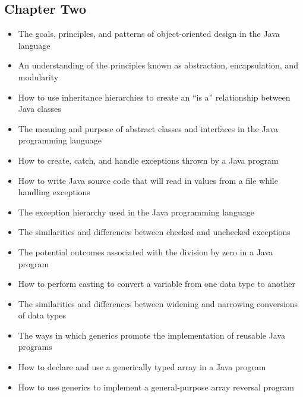 \documentclass[11pt]{article}
\begin{document}
\vspace*{-.2in}
\subsection*{Chapter Two}

\begin{itemize}

  \item The goals, principles, and patterns of object-oriented design in the
    Java language

  \item An understanding of the principles known as abstraction, encapsulation,
    and modularity

  \item How to use inheritance hierarchies to create an ``is a'' relationship
    between Java classes

  \item The meaning and purpose of abstract classes and interfaces in the Java
    programming language

  \item How to create, catch, and handle exceptions thrown by a Java program

  \item How to write Java source code that will read in values from a file while
    handling exceptions

  \item The exception hierarchy used in the Java programming language

  \item The similarities and differences between checked and unchecked
    exceptions

  \item The potential outcomes associated with the division by zero in a Java
    program

  \item How to perform casting to convert a variable from one data type to
    another

  \item The similarities and differences between widening and narrowing
    conversions of data types

  \item The ways in which generics promote the implementation of reusable Java
    programs

  \item How to declare and use a generically typed array in a Java program

  \item How to use generics to implement a general-purpose array reversal
    program

\end{itemize}
\end{document}
